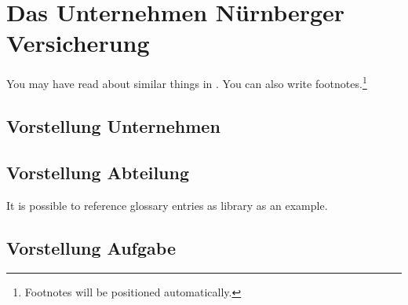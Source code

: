 \chapter{Das Unternehmen Nürnberger Versicherung}\label{ch:intro}

You may have read about similar things in \cite{Goodliffe2007}.
You can also write footnotes.\footnote{Footnotes will be positioned automatically.}
\blindtext

\blindtext
\section{Vorstellung Unternehmen}
\section{Vorstellung Abteilung}

It is possible to reference glossary entries as \gls{library} as an example.
\blindtext

\section{Vorstellung Aufgabe}
\blindtext
